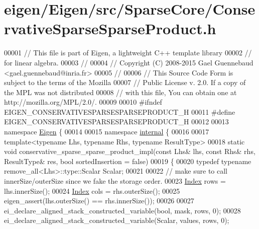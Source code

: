 \hypertarget{eigen_2_eigen_2src_2_sparse_core_2_conservative_sparse_sparse_product_8h_source}{}\section{eigen/\+Eigen/src/\+Sparse\+Core/\+Conservative\+Sparse\+Sparse\+Product.h}
\label{eigen_2_eigen_2src_2_sparse_core_2_conservative_sparse_sparse_product_8h_source}

\begin{DoxyCode}
00001 \textcolor{comment}{// This file is part of Eigen, a lightweight C++ template library}
00002 \textcolor{comment}{// for linear algebra.}
00003 \textcolor{comment}{//}
00004 \textcolor{comment}{// Copyright (C) 2008-2015 Gael Guennebaud <gael.guennebaud@inria.fr>}
00005 \textcolor{comment}{//}
00006 \textcolor{comment}{// This Source Code Form is subject to the terms of the Mozilla}
00007 \textcolor{comment}{// Public License v. 2.0. If a copy of the MPL was not distributed}
00008 \textcolor{comment}{// with this file, You can obtain one at http://mozilla.org/MPL/2.0/.}
00009 
00010 \textcolor{preprocessor}{#ifndef EIGEN\_CONSERVATIVESPARSESPARSEPRODUCT\_H}
00011 \textcolor{preprocessor}{#define EIGEN\_CONSERVATIVESPARSESPARSEPRODUCT\_H}
00012 
00013 \textcolor{keyword}{namespace }\hyperlink{namespace_eigen}{Eigen} \{ 
00014 
00015 \textcolor{keyword}{namespace }\hyperlink{namespaceinternal}{internal} \{
00016 
00017 \textcolor{keyword}{template}<\textcolor{keyword}{typename} Lhs, \textcolor{keyword}{typename} Rhs, \textcolor{keyword}{typename} ResultType>
00018 \textcolor{keyword}{static} \textcolor{keywordtype}{void} conservative\_sparse\_sparse\_product\_impl(\textcolor{keyword}{const} Lhs& lhs, \textcolor{keyword}{const} Rhs& rhs, ResultType& res, \textcolor{keywordtype}{bool} 
      sortedInsertion = \textcolor{keyword}{false})
00019 \{
00020   \textcolor{keyword}{typedef} \textcolor{keyword}{typename} remove\_all<Lhs>::type::Scalar Scalar;
00021 
00022   \textcolor{comment}{// make sure to call innerSize/outerSize since we fake the storage order.}
00023   \hyperlink{namespace_eigen_a62e77e0933482dafde8fe197d9a2cfde}{Index} rows = lhs.innerSize();
00024   \hyperlink{namespace_eigen_a62e77e0933482dafde8fe197d9a2cfde}{Index} cols = rhs.outerSize();
00025   eigen\_assert(lhs.outerSize() == rhs.innerSize());
00026   
00027   ei\_declare\_aligned\_stack\_constructed\_variable(\textcolor{keywordtype}{bool},   mask,     rows, 0);
00028   ei\_declare\_aligned\_stack\_constructed\_variable(Scalar, values,   rows, 0);

\end{DoxyCode}
